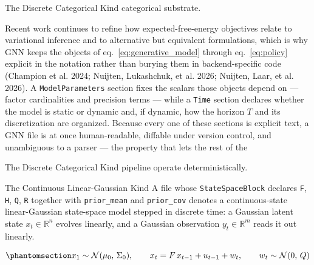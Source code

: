 \documentclass[
  ignorenonframetext,
]{beamer}
\begin{document}
\begin{frame}{The Discrete Categorical Kind}
categorical substrate.

Recent work continues to refine how expected-free-energy objectives
relate to variational inference and to alternative but equivalent
formulations, which is why GNN keeps the objects of
eq.~\ref{eq:generative_model} through eq.~\ref{eq:policy} explicit in
the notation rather than burying them in backend-specific code (Champion
et al. 2024; Nuijten, Lukashchuk, et al. 2026; Nuijten, Laar, et al.
2026). A \texttt{ModelParameters} section fixes the scalars those
objects depend on --- factor cardinalities and precision terms --- while
a \texttt{Time} section declares whether the model is static or dynamic
and, if dynamic, how the horizon \(T\) and its discretization are
organized. Because every one of these sections is explicit text, a GNN
file is at once human-readable, diffable under version control, and
unambiguous to a parser --- the property that lets the rest of the
\end{frame}

\begin{frame}{The Discrete Categorical Kind}
pipeline operate deterministically.
\end{frame}

\begin{frame}{The Continuous Linear-Gaussian
Kind}
\protect{}\label{the-continuous-linear-gaussian-kind}
A file whose \texttt{StateSpaceBlock} declares \texttt{F}, \texttt{H},
\texttt{Q}, \texttt{R} together with \texttt{prior\_mean} and
\texttt{prior\_cov} denotes a continuous-state linear-Gaussian
state-space model stepped in discrete time: a Gaussian latent state
\(x_t \in \mathbb{R}^n\) evolves linearly, and a Gaussian observation
\(y_t \in \mathbb{R}^m\) reads it out linearly.

\begin{equation}\protect\phantomsection\label{eq:lgssm_state}{
x_1 \sim \mathcal{N}(\mu_0,\, \Sigma_0), \qquad x_t = F\, x_{t-1} + u_{t-1} + w_t, \qquad w_t \sim \mathcal{N}(0,\, Q)
}\end{equation}

\end{frame}
\end{document}
